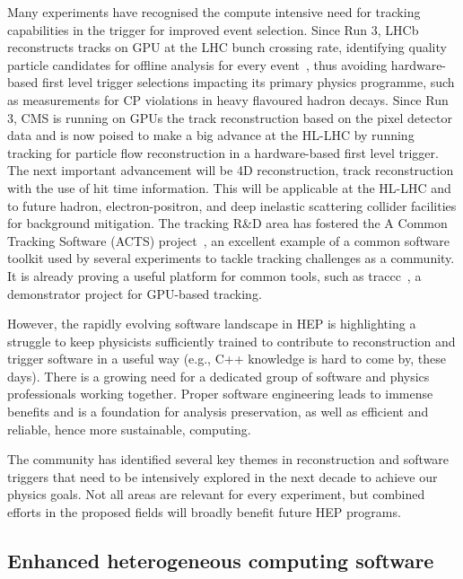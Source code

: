 \documentclass[10pt,a4paper]{article}
\begin{document}
Many experiments have recognised the compute intensive need for tracking
capabilities in the trigger for improved event selection. Since Run 3, LHCb
reconstructs tracks on GPU at the LHC bunch crossing rate, identifying quality
particle candidates for offline analysis for every event~\cite{LHCb:HLT}, thus
avoiding hardware-based first level trigger selections impacting its primary
physics programme, such as measurements for CP violations in heavy flavoured
hadron decays. Since Run 3, CMS is running on GPUs the track reconstruction
based on the pixel detector data and is now poised to make a big advance at the
HL-LHC by running tracking for particle flow reconstruction in a hardware-based
first level trigger. The next important advancement will be 4D reconstruction,
track reconstruction with the use of hit time information. This will be
applicable at the HL-LHC and to future hadron, electron-positron, and deep
inelastic scattering collider facilities for background mitigation. The tracking
R\&D area has fostered the A Common Tracking Software (ACTS) project~\cite{Ai2022Common},
an excellent example of a common software toolkit used by several experiments to
tackle tracking challenges as a community. It is already proving a useful
platform for common tools, such as traccc~\cite{yeo_2023_8119769, traccc}, a
demonstrator project for GPU-based tracking.

However, the rapidly evolving software landscape in HEP is highlighting a
struggle to keep physicists sufficiently trained to contribute to reconstruction
and trigger software in a useful way (e.g., C++ knowledge is hard to come by,
these days). There is a growing need for a dedicated group of software and
physics professionals working together. Proper software engineering leads to
immense benefits and is a foundation for analysis preservation, as well as
efficient and reliable, hence more sustainable, computing.

The community has identified several key themes in reconstruction and software
triggers that need to be intensively explored in the next decade to achieve our
physics goals. Not all areas are relevant for every experiment, but combined
efforts in the proposed fields will broadly benefit future HEP programs.

\subsection{Enhanced heterogeneous computing
software}\label{enhanced-heterogeneous-computing-software}
\end{document}
